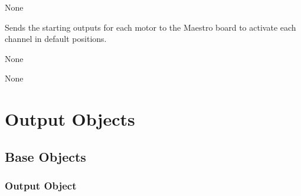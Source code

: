 \documentclass[letterpaper,10pt,english]{sphinxmanual}
\begin{document}
\begin{fulllineitems}
\begin{fulllineitems}
\begin{description}
\end{description}

\sphinxAtStartPar
None

\end{fulllineitems}


\begin{fulllineitems}
\label{\detokenize{mapping:MovementMap.MovementMap.start_outputs}}
\sphinxAtStartPar
Sends the starting outputs for each motor to the Maestro board to activate each channel in default positions.

\sphinxAtStartPar
None

\sphinxAtStartPar
None

\end{fulllineitems}


\end{fulllineitems}



\chapter{Output Objects}
\label{\detokenize{output:output-objects}}\label{\detokenize{output::doc}}

\section{Base Objects}
\label{\detokenize{base:base-objects}}\label{\detokenize{base::doc}}

\subsection{Output Object}
\label{\detokenize{base:module-OutputObject}}\label{\detokenize{base:output-object}}
\end{document}
